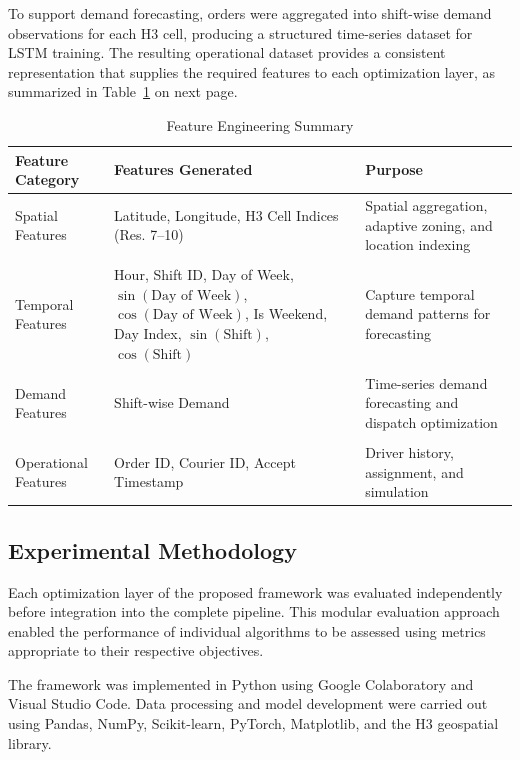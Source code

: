 \documentclass{article}
\begin{document}
To support demand forecasting, orders were aggregated into shift-wise demand observations for each H3 cell, producing a structured time-series dataset for LSTM training. The resulting operational dataset provides a consistent representation that supplies the required features to each optimization layer, as summarized in Table~\ref{tab:feature_engineering_summary} on next page.

\begin{table}[htbp]
\centering
\caption{Feature Engineering Summary}
\label{tab:feature_engineering_summary}
\begin{tabularx}{\textwidth}{>{\raggedright\arraybackslash}p{} >{\raggedright\arraybackslash}X >{\raggedright\arraybackslash}X}
\hline
\textbf{Feature Category} & \textbf{Features Generated} & \textbf{Purpose} \\
\hline
Spatial Features & Latitude, Longitude, H3 Cell Indices (Res. 7--10) & Spatial aggregation, adaptive zoning, and location indexing \\ \\
Temporal Features & Hour, Shift ID, Day of Week, $\sin(\text{Day of Week})$, $\cos(\text{Day of Week})$, Is Weekend, Day Index, $\sin(\text{Shift})$, $\cos(\text{Shift})$ & Capture temporal demand patterns for forecasting \\ \\
Demand Features & Shift-wise Demand & Time-series demand forecasting and dispatch optimization \\ \\
Operational Features & Order ID, Courier ID, Accept Timestamp & Driver history, assignment, and simulation \\
\hline
\end{tabularx}
\end{table}

\subsection{Experimental Methodology}
\label{subsec:experimental_methodology}

Each optimization layer of the proposed framework was evaluated independently before integration into the complete pipeline. This modular evaluation approach enabled the performance of individual algorithms to be assessed using metrics appropriate to their respective objectives.

The framework was implemented in Python using Google Colaboratory and Visual Studio Code. Data processing and model development were carried out using Pandas, NumPy, Scikit-learn, PyTorch, Matplotlib, and the H3 geospatial library.
\end{document}
